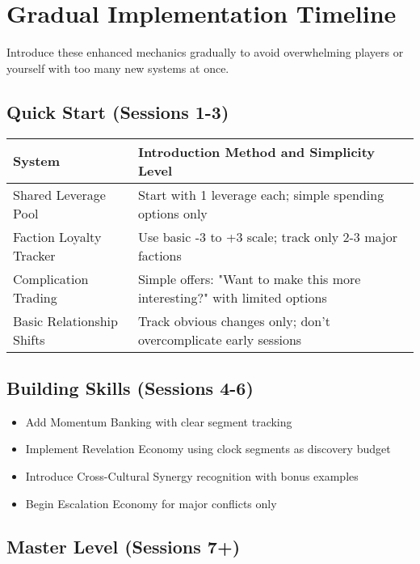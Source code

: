 \section*{Gradual Implementation Timeline}

Introduce these enhanced mechanics gradually to avoid overwhelming players or yourself with too many new systems at once.

\subsection*{Quick Start (Sessions 1-3)}

\begin{fatebox}
\begin{tabularx}{\textwidth}{lX}
\toprule
\textbf{System} & \textbf{Introduction Method and Simplicity Level} \\
\midrule
Shared Leverage Pool & Start with 1 leverage each; simple spending options only \\
Faction Loyalty Tracker & Use basic -3 to +3 scale; track only 2-3 major factions \\
Complication Trading & Simple offers: "Want to make this more interesting?" with limited options \\
Basic Relationship Shifts & Track obvious changes only; don't overcomplicate early sessions \\
\bottomrule
\end{tabularx}
\end{fatebox}

\subsection*{Building Skills (Sessions 4-6)}

\begin{itemize}
    \item Add Momentum Banking with clear segment tracking
    \item Implement Revelation Economy using clock segments as discovery budget
    \item Introduce Cross-Cultural Synergy recognition with bonus examples
    \item Begin Escalation Economy for major conflicts only
\end{itemize}

\subsection*{Master Level (Sessions 7+)}

